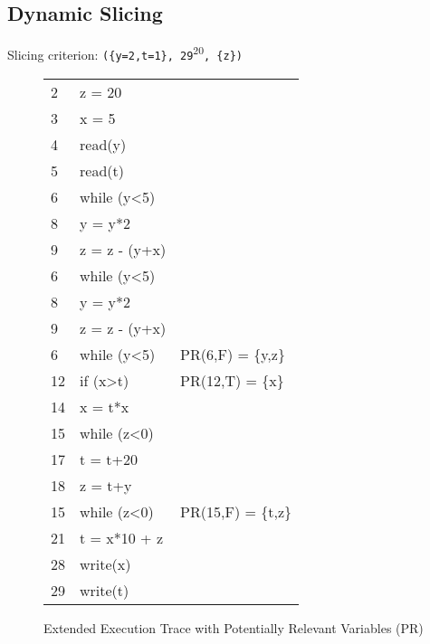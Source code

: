 \documentclass[10pt, a4paper]{article}
\newcounter{magicrownumbers} %
\begin{document}
\subsection{Dynamic Slicing}

Slicing criterion: \verb|({y=2,t=1}, 29|\textsuperscript{20}\verb|, {z})| \\

\begin{figure}[H]
\centering
\setcounter{magicrownumbers}{0}
\begin{tabular}{LVP}
2  & z = 20 \\                                %
3  & x = 5 \\                                 %
4  & read(y) \\                               %
5  & read(t) \\                               %
6  & while (y<5) \\                           %
8  & y = y*2 \\                               %
9  & z = z - (y+x) \\                         %
6  & while (y<5) \\                           %
8  & y = y*2 \\                               %
9  & z = z - (y+x) \\                         %
6  & while (y<5)   	 & PR(6,F) = \{y,z\} \\   %
12 & if (x>t)        & PR(12,T) = \{x\} \\    %
14 & x = t*x \\                               %
15 & while (z<0) \\                           %
17 & t = t+20 \\                              %
18 & z = t+y \\                               %
15 & while (z<0)     & PR(15,F) = \{t,z\} \\  %
21 & t = x*10 + z \\                          %
28 & write(x) \\
29 & write(t) \\
\end{tabular}
\caption*{Extended Execution Trace with Potentially Relevant Variables (PR)}
\end{figure}
\end{document}
